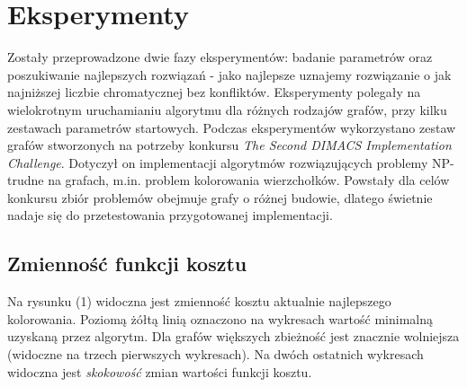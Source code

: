 \documentclass[12pt,a4paper]{article}
\begin{document}
\section{Eksperymenty}
Zostały przeprowadzone dwie fazy eksperymentów: badanie parametrów oraz poszukiwanie najlepszych rozwiązań - jako najlepsze uznajemy rozwiązanie o jak najniższej liczbie chromatycznej bez konfliktów. Eksperymenty polegały na wielokrotnym uruchamianiu algorytmu dla różnych rodzajów grafów, przy kilku zestawach parametrów startowych. Podczas eksperymentów wykorzystano zestaw grafów stworzonych na potrzeby konkursu \textit{The Second DIMACS Implementation Challenge}\cite{Johnson}. Dotyczył on implementacji algorytmów rozwiązujących problemy NP-trudne na grafach, m.in. problem kolorowania wierzchołków. Powstały dla celów konkursu zbiór problemów obejmuje grafy o różnej budowie, dlatego świetnie nadaje się do przetestowania przygotowanej implementacji.

\subsection{Zmienność funkcji kosztu}

Na rysunku (1) widoczna jest zmienność kosztu aktualnie najlepszego kolorowania. Poziomą żółtą linią oznaczono na wykresach wartość minimalną uzyskaną przez algorytm. Dla grafów większych zbieżność jest znacznie wolniejsza (widoczne na trzech pierwszych wykresach). Na dwóch ostatnich wykresach widoczna jest \textit{skokowość} zmian wartości funkcji kosztu.
\end{document}
